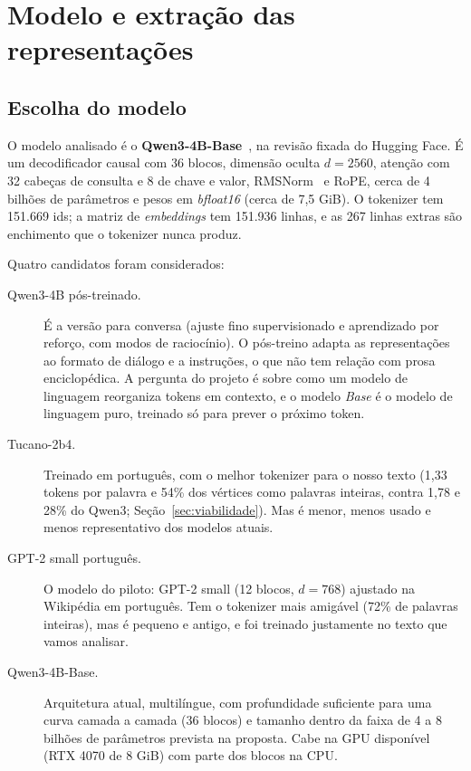 \section{Modelo e extração das representações}\label{sec:modelo}

\subsection{Escolha do modelo}\label{sec:mod-escolha}

O modelo analisado é o \textbf{Qwen3-4B-Base}~\cite{qwen3}, na revisão fixada
 do Hugging Face. É um decodificador causal com
36 blocos, dimensão oculta $d=2560$, atenção com 32 cabeças de consulta e 8 de chave e valor,
RMSNorm~\cite{zhang2019} e RoPE, cerca de 4 bilhões de parâmetros e pesos em
\emph{bfloat16} (cerca de 7,5 GiB). O tokenizer tem 151.669 ids; a matriz de
\emph{embeddings} tem 151.936 linhas, e as 267 linhas extras são enchimento que o tokenizer
nunca produz.

Quatro candidatos foram considerados:
\begin{description}
    \item[Qwen3-4B pós-treinado.] É a versão para conversa (ajuste fino supervisionado e
    aprendizado por reforço, com modos de raciocínio). O pós-treino adapta as representações ao
    formato de diálogo e a instruções, o que não tem relação com prosa enciclopédica. A
    pergunta do projeto é sobre como um modelo de linguagem reorganiza tokens em contexto, e o
    modelo \emph{Base} é o modelo de linguagem puro, treinado só para prever o próximo token.
    \item[Tucano-2b4.] Treinado em português, com o melhor tokenizer para o nosso texto (1,33
    tokens por palavra e 54\% dos vértices como palavras inteiras, contra 1,78 e 28\% do Qwen3;
    Seção~\ref{sec:viabilidade}). Mas é menor, menos usado e menos representativo dos modelos
    atuais.
    \item[GPT-2 small português.] O modelo do piloto: GPT-2 small (12 blocos, $d=768$) ajustado
    na Wikipédia em português. Tem o tokenizer mais amigável (72\% de palavras inteiras), mas
    é pequeno e antigo, e foi treinado justamente no texto que vamos analisar.
    \item[Qwen3-4B-Base.] Arquitetura atual, multilíngue, com profundidade suficiente para uma
    curva camada a camada (36 blocos) e tamanho dentro da faixa de 4 a 8 bilhões de parâmetros
    prevista na proposta. Cabe na GPU disponível (RTX 4070 de 8 GiB) com parte dos blocos na
    CPU.
\end{description}

